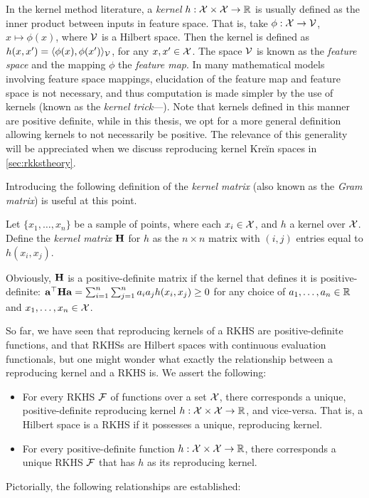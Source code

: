 \begin{remark}
  In the kernel method literature, a \emph{kernel} $h:{\mathcal X}\times{\mathcal X}\to\mathbb{R}$ is usually defined as the inner product between inputs in feature space.
  That is, take $\phi:{\mathcal X}\to{\mathcal V}$, $x\mapsto\phi(x)$, where ${\mathcal V}$ is a Hilbert space.
  Then the kernel is defined as $h(x,x') = \langle\phi(x),\phi(x')\rangle_{\mathcal V}$, for any $x,x'\in{\mathcal X}$.
  The space ${\mathcal V}$ is known as the \emph{feature space} and the mapping $\phi$ the \emph{feature map}.
  In many mathematical models involving feature space mappings, elucidation of the feature map and feature space is not necessary, and thus computation  is made simpler by the use of kernels (known as the \emph{kernel trick}---\cite{hofmann2008kernel}).
  Note that kernels defined in this manner are positive definite, while in this thesis, we opt for a more general definition allowing kernels to not necessarily be positive.
  The relevance of this generality will be appreciated when we discuss reproducing kernel Kreĭn spaces in \cref{sec:rkkstheory}.
\end{remark}

Introducing the following definition of the \emph{kernel matrix} (also known as the \emph{Gram matrix}) is useful at this point.
\begin{definition}
  Let $\{x_1,\dots,x_n\}$ be a sample of points, where each $x_i\in{\mathcal X}$, and $h$ a kernel over ${\mathcal X}$.
  Define the \emph{kernel matrix} ${\mathbf H}$ for $h$ as the $n \times n$ matrix with $(i,j)$ entries equal to $h(x_i,x_j)$.
\end{definition}
Obviously, ${\mathbf H}$ is a positive-definite matrix if the kernel that defines it is positive-definite: ${\mathbf a}^\top{\mathbf H}{\mathbf a} = \sum_{i=1}^n\sum_{j=1}^n a_ia_jh(x_i,x_j) \geq 0$ for any choice of $a_1,\dots,a_n\in\mathbb{R}$ and $x_1,\dots,x_n\in{\mathcal X}$.

So far, we have seen that reproducing kernels of a RKHS are positive-definite functions, and that RKHSs are Hilbert spaces with continuous evaluation functionals, but one might wonder what exactly the relationship between a reproducing kernel and a RKHS is.
We assert the following:
\begin{itemize}
  \item For every RKHS ${\mathcal F}$ of functions over a set ${\mathcal X}$, there corresponds a unique, positive-definite reproducing kernel $h:{\mathcal X}\times{\mathcal X}\to\mathbb{R}$, and vice-versa. That is, a Hilbert space is a RKHS if it possesses a unique, reproducing kernel.
  \item For every positive-definite function $h:{\mathcal X}\times{\mathcal X}\to\mathbb{R}$, there corresponds a unique RKHS ${\mathcal F}$ that has $h$ as its reproducing kernel.
\end{itemize}
Pictorially, the following relationships are established:

